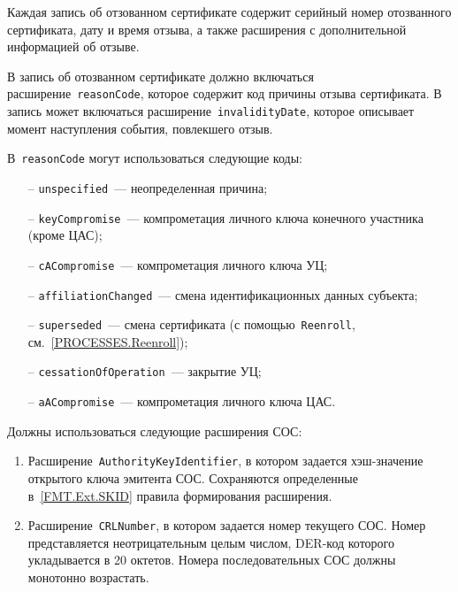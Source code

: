 Каждая запись об отзованном сертификате содержит серийный номер отозванного 
сертификата, дату и время отзыва, а также расширения с дополнительной
информацией об отзыве.

В запись об отозванном сертификате должно включаться
расширение~\texttt{reasonCode}, которое содержит код причины отзыва
сертификата.
%
В запись может включаться расширение~\texttt{invalidityDate}, которое 
описывает момент наступления события, повлекшего отзыв.

В~\texttt{reasonCode} могут использоваться следующие коды:
\begin{itemize}
\item[--]
\texttt{unspecified}~--- неопределенная причина;
\item[--]
\texttt{keyCompromise}~--- компрометация личного ключа конечного участника 
(кроме ЦАС); 
\item[--]
\texttt{cACompromise}~--- компрометация личного ключа УЦ;
\item[--]
\texttt{affiliationChanged}~--- смена идентификационных данных субъекта;
\item[--]
\texttt{superseded}~--- смена сертификата (с помощью~\texttt{Reenroll}, 
см.~\ref{PROCESSES.Reenroll}); 
\item[--]
\texttt{cessationOfOperation}~--- закрытие УЦ;
\item[--]
\texttt{aACompromise}~--- компрометация личного ключа ЦАС.
\end{itemize}

Должны использоваться следующие расширения СОС:
\begin{enumerate}
\item 
Расширение~\texttt{AuthorityKeyIdentifier}, в котором задается 
хэш-значение открытого ключа эмитента СОС. 
%
Сохраняются определенные в~\ref{FMT.Ext.SKID} правила формирования 
расширения.

\item
Расширение~\texttt{CRLNumber}, в котором задается номер текущего СОС.
Номер представляется неотрицательным целым числом, 
DER-код которого укладывается в 20 октетов. 
Номера последовательных СОС должны монотонно возрастать.
\end{enumerate}
